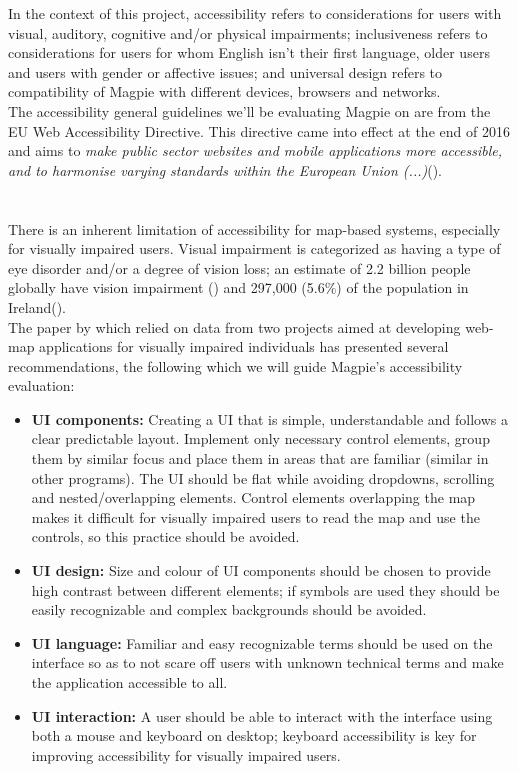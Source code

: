 \noindent In the context of this project, accessibility refers to considerations for users with visual, auditory, cognitive and/or physical impairments; inclusiveness refers to considerations for users for whom English isn't their first language, older users and users with gender or affective issues; and universal design refers to compatibility of Magpie with different devices, browsers and networks.\\
The accessibility general guidelines we'll be evaluating Magpie on are from the EU Web Accessibility Directive. This directive came into effect at the end of 2016 and aims to \emph{make public sector websites and mobile applications more accessible, and to harmonise varying standards within the European Union (...)}(\cite{webaccessibilitydirective2016}).\\\\
\\
There is an inherent limitation of accessibility for map-based systems, especially for visually impaired users. Visual impairment is categorized as having a type of eye disorder and/or a degree of vision loss; an estimate of 2.2 billion people globally have vision impairment (\cite{whoworldreportvision2019}) and 297,000 (5.6\%) of the population in Ireland(\cite{visionirelandcensus}).\\
The paper by \cite{accessibilitywebmapsrecommendations2017} which relied on data from two projects aimed at developing web-map applications for visually impaired individuals has presented several recommendations, the following which we will guide Magpie's accessibility evaluation:
\begin{itemize}
    \item \textbf{UI components:} Creating a UI that is simple, understandable and follows a clear predictable layout. Implement only necessary control elements, group them by similar focus and place them in areas that are familiar (similar in other programs). The UI should be flat while avoiding dropdowns, scrolling and nested/overlapping elements. Control elements overlapping the map makes it difficult for visually impaired users to read the map and use the controls, so this practice should be avoided.
    \item \textbf{UI design:} Size and colour of UI components should be chosen to provide high contrast between different elements; if symbols are used they should be easily recognizable and complex backgrounds should be avoided.
    \item \textbf{UI language:} Familiar and easy recognizable terms should be used on the interface so as to not scare off users with unknown technical terms and make the application accessible to all.
    \item \textbf{UI interaction:} A user should be able to interact with the interface using both a mouse and keyboard on desktop; keyboard accessibility is key for improving accessibility for visually impaired users.
\end{itemize}
\\


